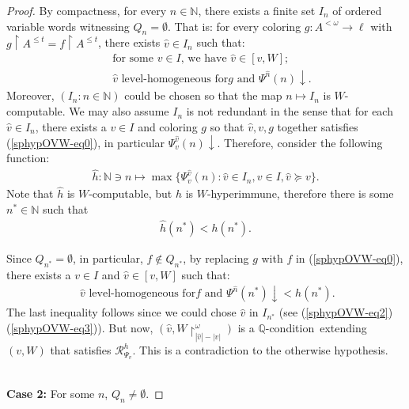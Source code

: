 \documentclass{article}
\def\mcal{\mathcal}
\def\h{\hat}
\def\uhr{\upharpoonright}
\def\sectionallymonochromatic{level-homogeneous}
\def\QQ{\mathbb{Q}}
\newcommand{\NN}[0]{\mathbb{N}}
\numberwithin{theorem}{section}
\theoremstyle{definition}
\begin{document}
\begin{proof}
By  compactness, for every $n\in\NN$, there  exists  a finite set $I_n$
of ordered variable words witnessing $Q_n=\emptyset$. That is:
for every coloring $g:A^{<\omega}\rightarrow\ell$ with
 $g\uhr A^{\leq t} = f\uhr A^{\leq t}$,
 there exists   $\h v\in I_n$ such that:
 \begin{align}\label{sphypOVW-eq0}
 &\text{ for some
 $v\in I$,  we have $\h v\in [v,W]$;}\\ \nonumber
 &\text{
 $\h v$ \sectionallymonochromatic\ for
$g$ and  $\Psi^{\h n}(n)\downarrow$.}
\end{align}
Moreover, $(I_n: n\in\NN)$ could be chosen so that the map
$n \mapsto I_n$ is $W$-computable.
We may also assume $I_n$ is not redundant in the sense that
for each $\h v\in I_n$, there exists a $v\in I$ and coloring $g$ so that
$\h v,v,g$ together satisfies (\ref{sphypOVW-eq0}),
in particular $\Psi_v^{\h v}(n)\downarrow$.
Therefore, consider the following function:
\begin{align}\label{sphypOVW-eq2}
\h h: \NN\ni n\mapsto \max\{\Psi^{\h v}_v(n):\h v\in I_n, v\in I, \h v\succeq v\}.
\end{align}
Note that $\h h$ is $W$-computable, but $h$ is $W$-hyperimmune, therefore there is some
$n^*\in\NN$ such that
\begin{align}
\label{sphypOVW-eq3}
\h h(n^*)<h(n^*).
\end{align}

Since $Q_{n^*}=\emptyset$, in particular, $f\notin Q_{n^*}$,
by replacing $g$ with $f$ in  (\ref{sphypOVW-eq0}),
there exists a $v\in I$ and $\h v\in [v,W]$
 such that:
\begin{align}\nonumber
 \text{
 $\h v$ \sectionallymonochromatic\ for
$f$ and  $\Psi^{\h n}(n^*)\downarrow<h(n^*)$.}
\end{align}
The last inequality follows since
we could chose $\h v$ in $ I_{n^*}$
(see (\ref{sphypOVW-eq2})(\ref{sphypOVW-eq3})).
But now,
$(\h v,W\uhr_{|\h v|-|v|}^\omega)$ is a $\QQ$-condition\ extending
$(v,W) $ that satisfies $\mcal R^h_{\Psi_v}$.
This is a contradiction to the otherwise hypothesis.


\ \\

\noindent\textbf{Case 2:}
For some $n$, $Q_n\ne\emptyset$.


\end{proof}
\end{document}
